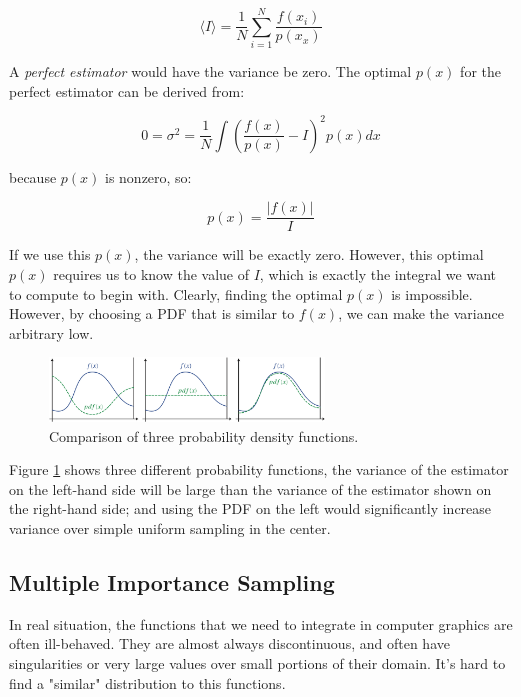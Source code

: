 \begin{equation}
	\langle I\rangle=\frac{1}{N}\sum_{i=1}^{N}\frac{f(x_i)}{p(x_x)}
\end{equation}

A \textit{perfect estimator} would have the variance be zero. The optimal $p(x)$ for the perfect estimator can be derived from:

\begin{equation}
	0=\sigma^2=\frac{1}{N}\int(\frac{f(x)}{p(x)}-I)^2p(x)dx
\end{equation}

because $p(x)$ is nonzero, so:

\begin{equation}
	p(x)=\frac{|f(x)|}{I}
\end{equation}

If we use this $p(x)$, the variance will be exactly zero. However, this optimal $p(x)$ requires us to know the value of $I$, which is exactly the integral we want to compute to begin with. Clearly, finding the optimal $p(x)$ is impossible. However, by choosing a PDF that is similar to $f(x)$, we can make the variance arbitrary low.

\begin{figure}\label{f:iimportance-figure}
	\includegraphics[width=0.65\textwidth]{graphics/gi/mc-11}
	\caption{Comparison of three probability density functions.}
\end{figure}

Figure \ref{f:iimportance-figure} shows three different probability functions, the variance of the estimator on the left-hand side will be large than the variance of the estimator shown on the right-hand side; and using the PDF on the left would significantly increase variance over simple uniform sampling in the center. 




\subsection{Multiple Importance Sampling}
In real situation, the functions that we need to integrate in computer graphics are often ill-behaved. They are almost always discontinuous, and often have singularities or very large values over small portions of their domain. It's hard to find a "similar" distribution to this functions.

